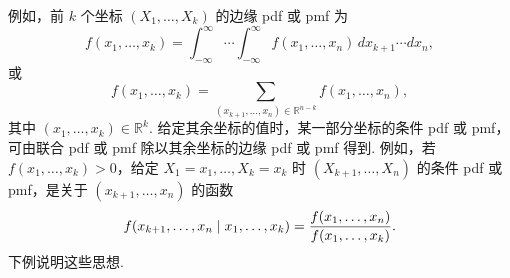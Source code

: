 例如，前 $k$ 个坐标 $(X_1,\ldots,X_k)$ 的边缘 pdf 或 pmf 为
\begin{equation}\label{eq:4.6.4}
f(x_1,\ldots,x_k)=\int_{-\infty}^{\infty}\cdots\int_{-\infty}^{\infty}f(x_1,\ldots,x_n)\,dx_{k+1}\cdots dx_n,
\end{equation}
或
\begin{equation}\label{eq:4.6.5}
f(x_1,\ldots,x_k)=\sum_{(x_{k+1},\ldots,x_n)\in\mathbb R^{n-k}}f(x_1,\ldots,x_n),
\end{equation}
其中 $(x_1,\ldots,x_k)\in\mathbb R^k$. 给定其余坐标的值时，某一部分坐标的条件 pdf 或 pmf，可由联合 pdf 或 pmf 除以其余坐标的边缘 pdf 或 pmf 得到. 例如，若 $f(x_1,\ldots,x_k)>0$，给定 $X_1=x_1,\ldots,X_k=x_k$ 时 $(X_{k+1},\ldots,X_n)$ 的条件 pdf 或 pmf，是关于 $(x_{k+1},\ldots,x_n)$ 的函数
\begin{equation}\label{eq:4.6.6}\index{SI0830@条件}\index{SI0851@条件}
f(x_{k+1},\ldots,x_n\mid x_1,\ldots,x_k)=\frac{f(x_1,\ldots,x_n)}{f(x_1,\ldots,x_k)}.
\end{equation}
下例说明这些思想.
